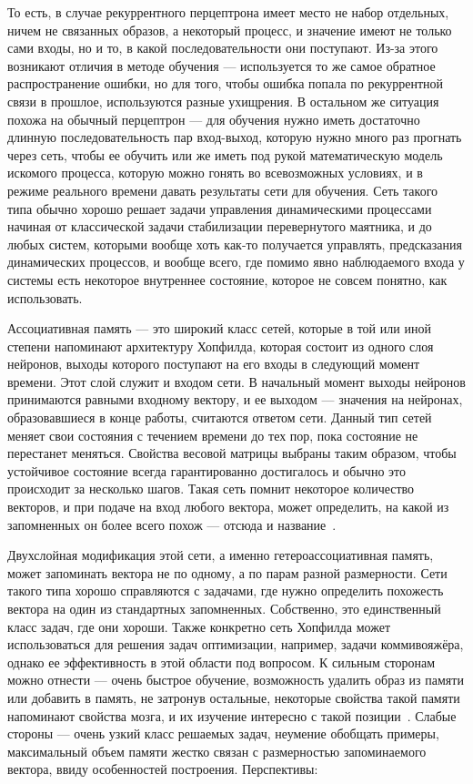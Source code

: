 То есть, в случае рекуррентного перцептрона имеет место не набор отдельных, ничем не связанных образов, а некоторый процесс, и значение имеют не только сами входы, но и то, в какой последовательности они поступают.
Из-за этого возникают отличия в методе обучения --- используется то же самое обратное распространение ошибки, но для того, чтобы ошибка попала по рекуррентной связи в прошлое, используются разные ухищрения.
В остальном же ситуация похожа на обычный перцептрон --- для обучения нужно иметь достаточно длинную последовательность пар вход-выход, которую нужно много раз прогнать через сеть, чтобы ее обучить или же иметь под рукой математическую модель искомого процесса, которую можно гонять во всевозможных условиях, и в режиме реального времени давать результаты сети для обучения.
Сеть такого типа обычно хорошо решает задачи управления динамическими процессами начиная от классической задачи стабилизации перевернутого маятника, и до любых систем, которыми вообще хоть как-то получается управлять, предсказания динамических процессов, и вообще всего, где помимо явно наблюдаемого входа у системы есть некоторое внутреннее состояние, которое не совсем понятно, как использовать.

Ассоциативная память --- это широкий класс сетей, которые в той или иной степени напоминают архитектуру Хопфилда, которая состоит из одного слоя нейронов, выходы которого поступают на его входы в следующий момент времени.
Этот слой служит и входом сети.
В начальный момент выходы нейронов принимаются равными входному вектору, и ее выходом --- значения на нейронах, образовавшиеся в конце работы, считаются ответом сети.
Данный тип сетей меняет свои состояния с течением времени до тех пор, пока состояние не перестанет меняться.
Свойства весовой матрицы выбраны таким образом, чтобы устойчивое состояние всегда гарантированно достигалось и обычно это происходит за несколько шагов.
Такая сеть помнит некоторое количество векторов, и при подаче на вход любого вектора, может определить, на какой из запомненных он более всего похож --- отсюда и название~\cite{domain_neuro_tech}.

Двухслойная модификация этой сети, а именно гетероассоциативная память, может запоминать вектора не по одному, а по парам разной размерности.
Сети такого типа хорошо справляются с задачами, где нужно определить похожесть вектора на один из стандартных запомненных.
Собственно, это единственный класс задач, где они хороши.
Также конкретно сеть Хопфилда может использоваться для решения задач оптимизации, например, задачи коммивояжёра, однако ее эффективность в этой области под вопросом.
К сильным сторонам можно отнести --- очень быстрое обучение, возможность удалить образ из памяти или добавить в память, не затронув остальные, некоторые свойства такой памяти напоминают свойства мозга, и их изучение интересно с такой позиции~\cite{domain_neuro_tech}.
Слабые стороны --- очень узкий класс решаемых задач, неумение обобщать примеры, максимальный объем памяти жестко связан с размерностью запоминаемого вектора, ввиду особенностей построения.
Перспективы:

